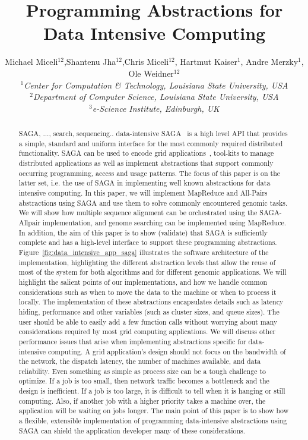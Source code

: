 \documentclass{rspublic}
\title{Programming Abstractions for Data Intensive Computing}
\author{Michael Miceli$^{12}$,Shantenu Jha$^{12}$,Chris Miceli$^{12}$, 
  Hartmut Kaiser$^{1}$, Andre Merzky$^{1}$, Ole Weidner$^{12}$ \\
  \small{\emph{$^{1}$Center for Computation \& Technology, Louisiana
      State University, USA}}\\
  \small{\emph{$^{2}$Department of Computer Science, Louisiana State
      University, USA}}\\
  \small{\emph{$^{3}$e-Science Institute, Edinburgh, UK}}\\
}
\begin{document}
\maketitle

\begin{abstract}{SAGA, ..., search, sequencing.. data-intensive}
  SAGA~\cite{saga_gfd90} is a high level API that provides a simple,
  standard and uniform interface for the most commonly required
  distributed functionality.  SAGA can be used to encode grid
  applications~\cite{saga_escience07, saga_tg08}, tool-kits to manage
  distributed applications as well as implement abstractions that
  support commonly occurring programming, access and usage patterns.
  The focus of this paper is on the latter set, i.e.  the use of SAGA
  in implementing well known abstractions for data intensive
  computing.  In this paper, we will implement MapReduce and All-Pairs
  abstractions using SAGA and use them to solve commonly encountered
  genomic tasks.  We will show how multiple sequence alignment can be
  orchestrated using the SAGA-Allpair implementation, and genome
  searching can be implemented using MapReduce.  In addition, the aim
  of this paper is to show (validate) that SAGA is sufficiently
  complete and has a high-level interface to support these programming
  abstractions.  Figure~\ref{fig:data_intensive_app_saga} illustrates
  the software architecture of the implementation, highlighting the
  different abstraction levels that allow the reuse of most of the
  system for both algorithms and for different genomic applications.
  We will highlight the salient points of our implementations, and how
  we handle common considerations such as when to move the data to the
  machine or when to process it locally.  The implementation of these
  abstractions encapsulates details such as latency hiding,
  performance and other variables (such as cluster sizes, and queue
  sizes).  The user should be able to easily add a few function calls
  without worrying about many considerations required by most grid
  computing applications.  We will discuss other performance issues
  that arise when implementing abstractions specific for
  data-intensive computing.  A grid application's design should not
  focus on the bandwidth of the network, the dispatch latency, the
  number of machines available, and data reliability.  Even something
  as simple as process size can be a tough challenge to optimize.  If
  a job is too small, then network traffic becomes a bottleneck and
  the design is inefficient.  If a job is too large, it is difficult
  to tell when it is hanging or still computing.  Also, if another job
  with a higher priority takes a machine over, the application will be
  waiting on jobs longer.  The main point of this paper is to show how
  a flexible, extensible implementation of programming data-intensive
  abstractions using SAGA can shield the application developer many of
  these considerations.

\end{abstract}
\end{document}
